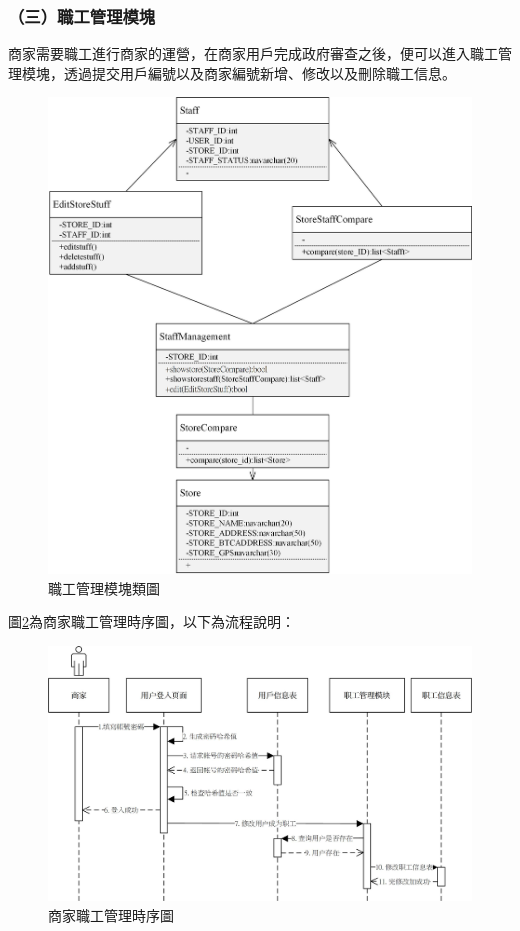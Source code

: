 \subsubsection{（三）職工管理模塊}
商家需要職工進行商家的運營，在商家用戶完成政府審查之後，便可以進入職工管理模塊，透過提交用戶編號以及商家編號新增、修改以及刪除職工信息。

	\begin{figure}[htbp]
		\centering
		\includegraphics[width = 1\textwidth]{c1.jpg}
		\caption{職工管理模塊類圖}\label{c1}
	\end{figure}

	

	圖\ref{time2}為商家職工管理時序圖，以下為流程說明：

	\begin{figure}[htbp]
		\centering
		\includegraphics[width = 1\textwidth]{time2.jpg}
		\caption{商家職工管理時序圖}\label{time2}
	\end{figure}

